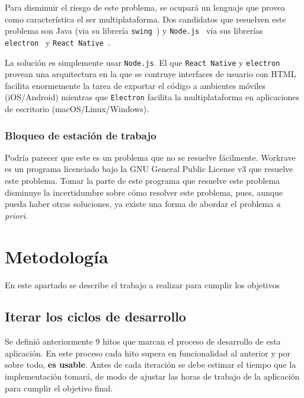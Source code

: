 \documentclass[12pt,letterpaper]{report}
\begin{document}
Para disminuir el riesgo de este problema, se ocupará un lenguaje que provea como característica el ser multiplataforma.
Dos candidatos que resuelven este problema son Java (via su librería \texttt{swing}~\cite{javaswing}) y
\texttt{Node.js}~\cite{nodejs} vía sus librerías \texttt{electron}~\cite{electron} y \texttt{React\
Native}~\cite{react-native}.

La solución es simplemente usar \texttt{Node.js}. El que \texttt{React Native} y \texttt{electron} provean una
arquitectura en la que se contruye interfaces de usuario con HTML facilita enormemente la tarea de exportar el código a
ambientes móviles (iOS/Android) mientras que \texttt{Electron} facilita la multiplataforma en aplicaciones de escritorio
(macOS/Linux/Windows).

\subsubsection{Bloqueo de estación de trabajo}\label{bloqueo-de-estacion-de-trabajo}

Podría parecer que este es un problema que no se resuelve fácilmente. Workrave~\cite{workrave} es un programa licenciado
bajo la GNU General Public License v3 que resuelve este problema. Tomar la parte de este programa que resuelve este
problema disminuye la incertidumbre sobre cómo resolver este problema, pues, aunque pueda haber otras soluciones, ya
existe una forma de abordar el problema \emph{a priori}.

\newpage
\section{Metodología}\label{metodologuxeda}

En este apartado se describe el trabajo a realizar para cumplir los
objetivos

\subsection{Iterar los ciclos de desarrollo}\label{iterar-los-ciclos-de-desarrollo}

Se definió anteriormente 9 hitos que marcan el proceso de desarrollo de esta aplicación. En este proceso cada hito
supera en funcionalidad al anterior y por sobre todo, \textbf{es usable}. Antes de cada iteración se debe estimar el
tiempo que la implementación tomará, de modo de ajustar las horas de trabajo de la aplicación para cumplir el objetivo
final.
\end{document}
